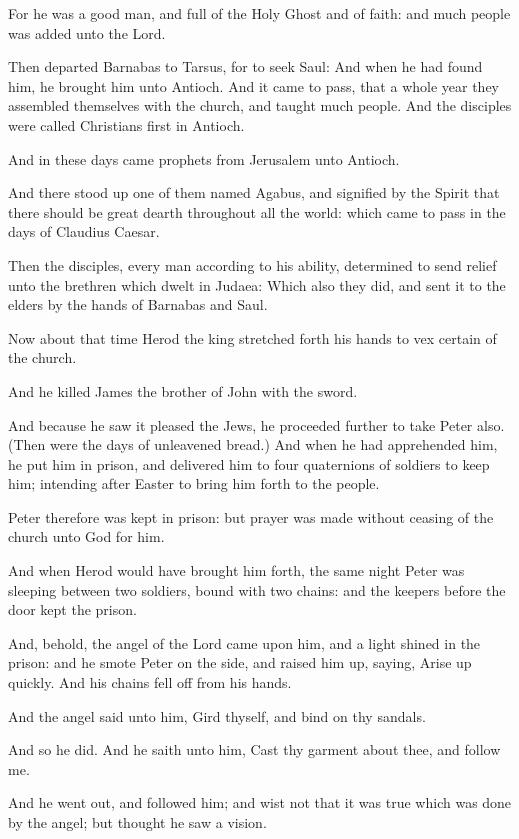\Verse For he was a good man, and full of the Holy Ghost and of faith: and much people was added unto the Lord.

\Verse Then departed Barnabas to Tarsus, for to seek Saul: \Verse And when he had found him, he brought him unto Antioch. And it came to pass, that a whole year they assembled themselves with the church, and taught much people. And the disciples were called Christians first in Antioch.

\Verse And in these days came prophets from Jerusalem unto Antioch.

\Verse And there stood up one of them named Agabus, and signified by the Spirit that there should be great dearth throughout all the world: which came to pass in the days of Claudius Caesar.

\Verse Then the disciples, every man according to his ability, determined to send relief unto the brethren which dwelt in Judaea: \Verse Which also they did, and sent it to the elders by the hands of Barnabas and Saul.


\Chapter
\Verse Now about that time Herod the king stretched forth his hands to vex certain of the church.

\Verse And he killed James the brother of John with the sword.

\Verse And because he saw it pleased the Jews, he proceeded further to take Peter also. (Then were the days of unleavened bread.)  \Verse And when he had apprehended him, he put him in prison, and delivered him to four quaternions of soldiers to keep him; intending after Easter to bring him forth to the people.

\Verse Peter therefore was kept in prison: but prayer was made without ceasing of the church unto God for him.

\Verse And when Herod would have brought him forth, the same night Peter was sleeping between two soldiers, bound with two chains: and the keepers before the door kept the prison.

\Verse And, behold, the angel of the Lord came upon him, and a light shined in the prison: and he smote Peter on the side, and raised him up, saying, Arise up quickly. And his chains fell off from his hands.

\Verse And the angel said unto him, Gird thyself, and bind on thy sandals.

And so he did. And he saith unto him, Cast thy garment about thee, and follow me.

\Verse And he went out, and followed him; and wist not that it was true which was done by the angel; but thought he saw a vision.

